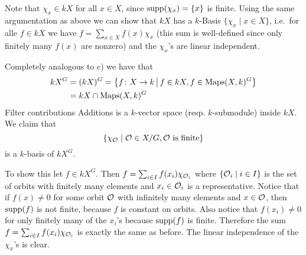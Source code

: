 Note that $\chi_x \in kX$ for all $x \in X$, since $\operatorname{supp}(\chi_x) = \{x\}$ is finite. Using the same argumentation as above we can show that $kX$ has a $k$-Basis $\{\chi_x \mid x \in X\}$, i.e.\ for alle $f \in kX$ we have $f = \sum_{x \in X} f(x) \chi_x$ (this sum is well-defined since only finitely many $f(x)$ are nonzero) and the $\chi_x$’s are linear independent.

Completely analogous to c) we have that
\begin{align*}
 kX^G
 &= (kX)^G = \left\{f \colon X \to k \,\middle|\, f \in kX, f \in \operatorname{Maps}(X,k)^G\right\} \\
 &= kX \cap \operatorname{Maps}(X,k)^G
\end{align*}Filter contributions
Additions
is a $k$-vector space (resp. $k$-submodule) inside $kX$. We claim that
\[
 \{\chi_\mathcal{O} \mid \mathcal{O} \in X/G, \mathcal{O} \text{ is finite}\}
\]
is a $k$-basis of $kX^G$.

To show this let $f \in kX^G$. Then $f = \sum_{i \in I} f(x_i) \chi_{\mathcal{O}_i}$ where $\{\mathcal{O}_i \mid i \in I\}$ is the set of orbits with finitely many elements and $x_i \in \mathcal{O}_i$ is a representative. Notice that if $f(x) \neq 0$ for some orbit $\mathcal{O}$ with infinitely many elements and $x \in \mathcal{O}$, then $\operatorname{supp}(f)$ is not finite, because $f$ is constant on orbits. Also notice that $f(x_i) \neq 0$ for only finitely many of the $x_i$’s because $\operatorname{supp}(f)$ is finite. Therefore the sum $f = \sum_{i \in I} f(x_i) \chi_{\mathcal{O}_i}$ is exactly the same as before. The linear independence of the $\chi_x$’s is clear.



